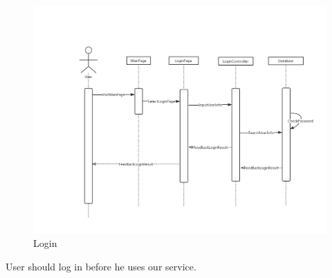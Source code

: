 \documentclass[16pt]{scrreprt}
\begin{document}
\begin{figure}[H]
    \includegraphics[width=\linewidth]{./FuncPhoto/2.png}   
    \caption{Login}
\end{figure}
User should log in before he uses our service. 
\end{document}
